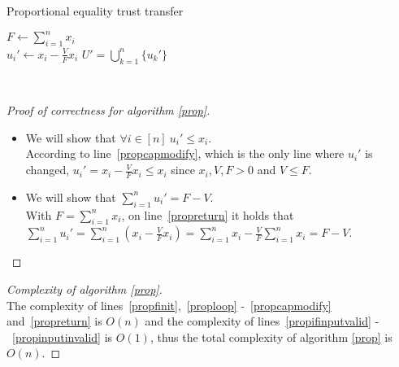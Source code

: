\documentclass[11pt]{article}
\theoremstyle{definition}
\theoremstyle{corollary}
\theoremstyle{lemma}
\begin{document}
    \begin{algorithm}[H]
       \label{prop}
       \caption{Proportional equality trust transfer}
       $F \gets \sum\limits_{i=1}^{n}x_i$ \label{propfinit} \\
          {$u_i' \gets x_i - \frac{V}{F} x_i$ \label{propcapmodify}}
       \Return $U' = \bigcup\limits_{k=1}^{n}\{u_k'\}$ \label{propreturn}
    \end{algorithm} \ \\
    \begin{proof}[Proof of correctness for algorithm \ref{prop}] \
       \begin{itemize}
          \item We will show that $\forall i \in [n] \: u_i' \leq x_i$. \\
          According to line~\ref{propcapmodify}, which is the only line where $u_i'$ is changed,
          $u_i' = x_i - \frac{V}{F}x_i \leq x_i$ since $x_i, V, F > 0$ and $V \leq F$.
          \item We will show that $\sum\limits_{i=1}^{n}u_i' = F - V$. \\
          With $F = \sum\limits_{i=1}^{n}x_i$, on line~\ref{propreturn} it holds that $\sum\limits_{i=1}^{n}u_i' =
          \sum\limits_{i=1}^{n}(x_i - \frac{V}{F}x_i) = \sum\limits_{i=1}^{n}x_i - \frac{V}{F}\sum\limits_{i=1}^{n}x_i =
          F - V$.
       \end{itemize}
    \end{proof}
    \begin{proof}[Complexity of algorithm \ref{prop}] \ \\
       The complexity of lines~\ref{propfinit},~\ref{proploop} -~\ref{propcapmodify} and~\ref{propreturn} is $O(n)$ and the
       complexity of lines~\ref{propifinputvalid} -~\ref{propinputinvalid} is $O(1)$, thus the total complexity of algorithm
       \ref{prop} is $O(n)$.
    \end{proof}
\end{document}
